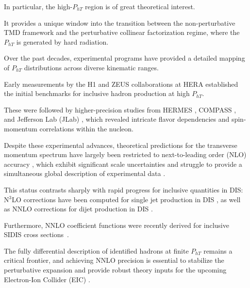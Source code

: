\documentclass[prl,aps,twocolumn,superscriptaddress]{revtex4}
\begin{document}
In particular, the high-$P_{hT}$ region is of great theoretical interest.

It provides a unique window into the transition between the non-perturbative TMD framework and the perturbative collinear factorization regime, where the $P_{hT}$ is generated by hard radiation.



Over the past decades, experimental programs have provided a detailed mapping of $P_{hT}$ distributions across diverse kinematic ranges.

Early measurements by the H1 \cite{H1:1996muf, H1:1999iry, H1:2004xgw} and ZEUS \cite{ZEUS:1995acw, ZEUS:1999ies} collaborations at HERA established the initial benchmarks for inclusive hadron production at high $P_{hT}$.

These were followed by higher-precision studies from HERMES \cite{HERMES:2012uyd}, COMPASS \cite{COMPASS:2013bfs, COMPASS:2017mvk}, and Jefferson Lab (JLab) \cite{JeffersonLabHallA:2016ctn}, which revealed intricate flavor dependencies and spin-momentum correlations within the nucleon.



Despite these experimental advances, theoretical predictions for the transverse momentum spectrum have largely been restricted to next-to-leading order (NLO) accuracy \cite{Kniehl:2004hf, Daleo:2004pn, Wang:2019bvb}, which exhibit significant scale uncertainties and struggle to provide a simultaneous global description of experimental data \cite{Gonzalez-Hernandez:2018ipj}.

This status contrasts sharply with rapid progress for inclusive quantities in DIS: N$^3$LO corrections have been computed for single jet production in DIS \cite{Currie:2018fgr}, as well as NNLO corrections for dijet production in DIS \cite{Currie:2017tpe}.

Furthermore, NNLO coefficient functions were recently derived for inclusive SIDIS cross sections~\cite{Abele:2021nyo, Goyal:2023zdi, Bonino:2024qbh, Bonino:2024wgg, Goyal:2024tmo, Goyal:2024emo, Bonino:2025tnf, Haug:2025ava, Bonino:2025qta, Zhou:2025lqv, Bonino:2025bqa, Goyal:2025qyu, Gao:2026tnd}.



The fully differential description of identified hadrons at finite $P_{hT}$ remains a critical frontier, and achieving NNLO precision is essential to stabilize the perturbative expansion and provide robust theory inputs for the upcoming Electron-Ion Collider (EIC) \cite{Accardi:2012qut, AbdulKhalek:2021gbh}.
\end{document}

